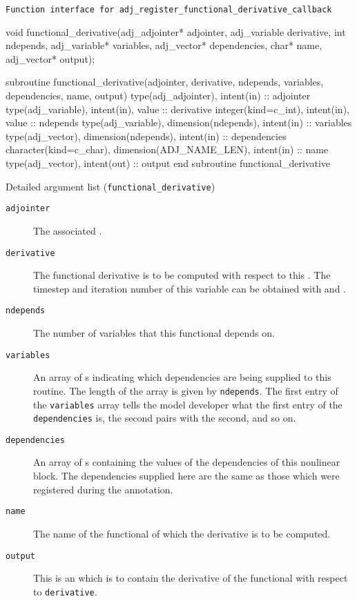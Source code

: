 \begin{boxwithtitle}{\texttt{Function interface for \texttt{adj_register_functional_derivative_callback}}}
\begin{minipage}{\columnwidth}
\begin{ccode}
  void functional_derivative(adj_adjointer* adjointer,
                                 adj_variable derivative, int ndepends, 
                                 adj_variable* variables, adj_vector* dependencies,
                                 char* name, adj_vector* output);
\end{ccode}
\begin{fortrancode}
  subroutine functional_derivative(adjointer, derivative, ndepends, variables, 
                                   dependencies, name, output) 
    type(adj_adjointer), intent(in) :: adjointer
    type(adj_variable), intent(in), value :: derivative 
    integer(kind=c_int), intent(in), value :: ndepends
    type(adj_variable), dimension(ndepends), intent(in) :: variables
    type(adj_vector), dimension(ndepends), intent(in) :: dependencies
    character(kind=c_char), dimension(ADJ_NAME_LEN), intent(in) :: name
    type(adj_vector), intent(out) :: output
  end subroutine functional_derivative
\end{fortrancode}
\end{minipage}
\end{boxwithtitle}

\begin{boxwithtitle}{Detailed argument list (\texttt{functional_derivative})}
\begin{description}
\item[\texttt{adjointer}] The associated .
\item[\texttt{derivative}] The functional derivative is to be computed with respect to this . The timestep and iteration number of this variable can be obtained with  and .
\item[\texttt{ndepends}] The number of variables that this functional depends on.
\item[\texttt{variables}] An array of s indicating which dependencies are being supplied to this routine. The length of the
array is given by \texttt{ndepends}. The first entry of the \texttt{variables} array
tells the model developer what the first entry of the \texttt{dependencies} is, the second pairs with the second, and so on.
\item[\texttt{dependencies}] An array of s containing the values of the dependencies of this nonlinear block. The dependencies supplied
here are the same as those which were registered during the annotation.
\item[\texttt{name}] The name of the functional of which the derivative is to be computed.
\item[\texttt{output}] This is an  which is to contain the derivative of the functional with respect to \texttt{derivative}. 
\end{description}
\end{boxwithtitle}

